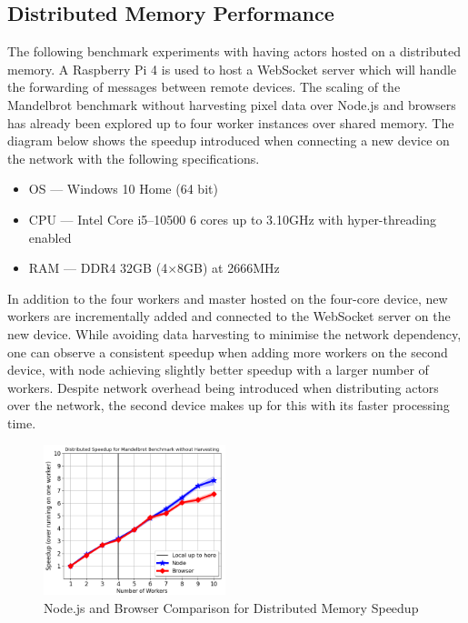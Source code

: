 \documentclass[lettersize,journal]{IEEEtran}
\begin{document}
\subsection{Distributed Memory Performance}
The following benchmark experiments with having actors hosted on a distributed memory. A Raspberry Pi 4 is used to host a WebSocket server which will handle the forwarding of messages between remote devices. The scaling of the Mandelbrot benchmark without harvesting pixel data over Node.js and browsers has already been explored up to four worker instances over shared memory. The diagram below shows the speedup introduced when connecting a new device on the network with the following specifications.
\begin{itemize}
    \item OS --- Windows 10 Home (64 bit)
    \item CPU --- Intel Core i5--10500 6 cores up to 3.10GHz with hyper-threading enabled
    \item RAM --- DDR4 32GB (4$\times$8GB) at 2666MHz
\end{itemize}
In addition to the four workers and master hosted on the four-core device, new workers are incrementally added and connected to the WebSocket server on the new device. While avoiding data harvesting to minimise the network dependency, one can observe a consistent speedup when adding more workers on the second device, with node achieving slightly better speedup with a larger number of workers. Despite network overhead being introduced when distributing actors over the network, the second device makes up for this with its faster processing time.
\begin{figure}[H]
    \begin{centering}
        \includegraphics[width=200px]{resources/distributed_memory_speedup.png}
        \caption{Node.js and Browser Comparison for Distributed Memory Speedup}
    \end{centering}
\end{figure}
\end{document}
